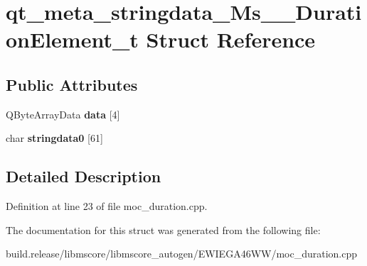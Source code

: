 \hypertarget{structqt__meta__stringdata___ms_____duration_element__t}{}\section{qt\+\_\+meta\+\_\+stringdata\+\_\+\+Ms\+\_\+\+\_\+\+Duration\+Element\+\_\+t Struct Reference}
\label{structqt__meta__stringdata___ms_____duration_element__t}
\subsection*{Public Attributes}
\begin{DoxyCompactItemize}
\item 
\mbox{\label{structqt__meta__stringdata___ms_____duration_element__t_acd9d538dac33af1d18407e2107d56c4d}} 
Q\+Byte\+Array\+Data {\bfseries data} \mbox{[}4\mbox{]}
\item 
\mbox{\label{structqt__meta__stringdata___ms_____duration_element__t_a40b3c5b483eaca0e8f5c4bdc2fa12c62}} 
char {\bfseries stringdata0} \mbox{[}61\mbox{]}
\end{DoxyCompactItemize}


\subsection{Detailed Description}


Definition at line 23 of file moc\+\_\+duration.\+cpp.



The documentation for this struct was generated from the following file\+:\begin{DoxyCompactItemize}
\item 
build.\+release/libmscore/libmscore\+\_\+autogen/\+E\+W\+I\+E\+G\+A46\+W\+W/moc\+\_\+duration.\+cpp\end{DoxyCompactItemize}
